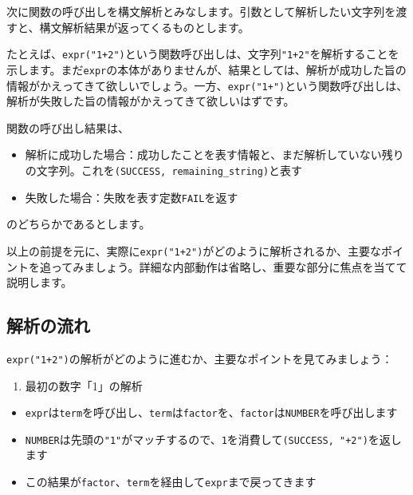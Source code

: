 次に関数の呼び出しを構文解析とみなします。引数として解析したい文字列を渡すと、構文解析結果が返ってくるものとします。

たとえば、\texttt{expr("1+2")}という関数呼び出しは、文字列\texttt{"1+2"}を解析することを示します。まだ\texttt{expr}の本体がありませんが、結果としては、解析が成功した旨の情報がかえってきて欲しいでしょう。一方、\texttt{expr("1+")}という関数呼び出しは、解析が失敗した旨の情報がかえってきて欲しいはずです。

関数の呼び出し結果は、

\begin{itemize}
\tightlist
\item
  解析に成功した場合：成功したことを表す情報と、まだ解析していない残りの文字列。これを\texttt{(SUCCESS,\ remaining\_string)}と表す
\item
  失敗した場合：失敗を表す定数\texttt{FAIL}を返す
\end{itemize}

のどちらかであるとします。

以上の前提を元に、実際に\texttt{expr("1+2")}がどのように解析されるか、主要なポイントを追ってみましょう。詳細な内部動作は省略し、重要な部分に焦点を当てて説明します。

\hypertarget{chapter2-ux89e3ux6790ux306eux6d41ux308c}{%
\subsection{解析の流れ}\label{chapter2-ux89e3ux6790ux306eux6d41ux308c}}

\texttt{expr("1+2")}の解析がどのように進むか、主要なポイントを見てみましょう：

\begin{enumerate}
\def\labelenumi{\arabic{enumi}.}
\tightlist
\item
  最初の数字「1」の解析
\end{enumerate}

\begin{itemize}
\tightlist
\item
  \texttt{expr}は\texttt{term}を呼び出し、\texttt{term}は\texttt{factor}を、\texttt{factor}は\texttt{NUMBER}を呼び出します
\item
  \texttt{NUMBER}は先頭の\texttt{"1"}がマッチするので、\texttt{1}を消費して\texttt{(SUCCESS,\ "+2")}を返します
\item
  この結果が\texttt{factor}、\texttt{term}を経由して\texttt{expr}まで戻ってきます
\end{itemize}

